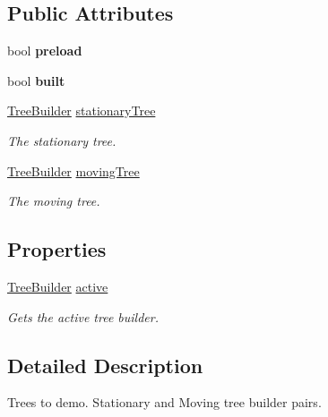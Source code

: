 \subsection*{Public Attributes}
\begin{DoxyCompactItemize}
\item 
\mbox{\label{class_fractal_tree_1_1_demo_1_1_trees_to_demo_a9c065899e43c7cc2a9d84601e39dc4a5}} 
bool {\bfseries preload}
\item 
\mbox{\label{class_fractal_tree_1_1_demo_1_1_trees_to_demo_a6e9e96dbbfe2710d3c0faf37ccd3ea61}} 
bool {\bfseries built}
\item 
\hyperlink{class_fractal_tree_1_1_tree_builder}{Tree\+Builder} \hyperlink{class_fractal_tree_1_1_demo_1_1_trees_to_demo_aa5d13795814c54312725bbe500a0c05b}{stationary\+Tree}
\begin{DoxyCompactList}\small\item\em The stationary tree. \end{DoxyCompactList}\item 
\hyperlink{class_fractal_tree_1_1_tree_builder}{Tree\+Builder} \hyperlink{class_fractal_tree_1_1_demo_1_1_trees_to_demo_a8ebc7052928d860fd758a5ecfbff5710}{moving\+Tree}
\begin{DoxyCompactList}\small\item\em The moving tree. \end{DoxyCompactList}\end{DoxyCompactItemize}
\subsection*{Properties}
\begin{DoxyCompactItemize}
\item 
\hyperlink{class_fractal_tree_1_1_tree_builder}{Tree\+Builder} \hyperlink{class_fractal_tree_1_1_demo_1_1_trees_to_demo_a4c255b3c34a65405fd1c69a81bb9a0a0}{active}
\begin{DoxyCompactList}\small\item\em Gets the active tree builder. \end{DoxyCompactList}\end{DoxyCompactItemize}


\subsection{Detailed Description}
Trees to demo. Stationary and Moving tree builder pairs. 




